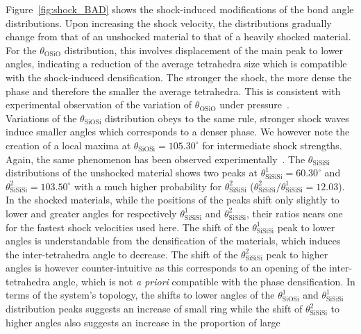 \documentclass[aps,10pt,twocolumn]{revtex4}
\newcommand{\mrm}[1]{\ensuremath{\mathrm{#1}}\xspace}
\begin{document}
Figure~\ref{fig:shock_BAD} shows the shock-induced modifications of the bond angle
distributions. Upon increasing the shock velocity, the distributions gradually change from that
of an unshocked material to that of a heavily shocked material. For
the $\theta_\mrm{OSiO}$ distribution, this involves displacement of the main peak to lower angles, indicating
a reduction of the average tetrahedra size which is compatible with the shock-induced
densification. The stronger the shock, the more dense the phase and therefore the smaller the
average tetrahedra. This is consistent with experimental observation of the variation of
$\theta_\mrm{OSiO}$ under pressure~\cite{DevineArndt87,DevineDupree87}.\\
Variations of the $\theta_\mrm{SiOSi}$ distribution obeys to the same rule, stronger shock waves
induce smaller angles which corresponds to a denser phase. We however note the creation of a
local maxima at $\theta_{\mrm{SiOSi}}=105.30^\circ$ for intermediate shock strengths. Again, the
same phenomenon has been observed experimentally~\cite{HemleyMao86,OkunoReynard99}.
The $\theta_\mrm{SiSiSi}$ distributions of the unshocked material shows two peaks at
$\theta^1_{\mrm{SiSiSi}}=60.30^\circ$ and $\theta^2_{\mrm{SiSiSi}}=103.50^\circ$ with a much higher
probability for $\theta^2_{\mrm{SiSiSi}}$
($\theta^2_{\mrm{SiSiSi}}/\theta^1_{\mrm{SiSiSi}}=12.03$). In the shocked materials, while the 
positions of the peaks shift only slightly to lower and greater angles for respectively
$\theta^1_{\mrm{SiSiSi}}$ and $\theta^2_{\mrm{SiSiSi}}$, their ratios nears one for the fastest
shock velocities used here. The shift of the $\theta^1_{\mrm{SiSiSi}}$ peak to lower
angles is understandable from the densification of the materials, which induces the
inter-tetrahedra angle to decrease. The shift of the $\theta^2_{\mrm{SiSiSi}}$ peak to higher
angles is however counter-intuitive as this corresponds to an opening of the inter-tetrahedra
angle, which is not \emph{a priori} compatible with the phase densification. In terms of the
system's topology, the shifts to lower angles of the $\theta^1_{\mrm{SiOSi}}$ and
$\theta^1_{\mrm{SiSiSi}}$ distribution peaks suggests an increase of small ring while the shift of
$\theta^2_{\mrm{SiSiSi}}$ to higher angles also suggests an increase in the proportion of large 
\end{document}
